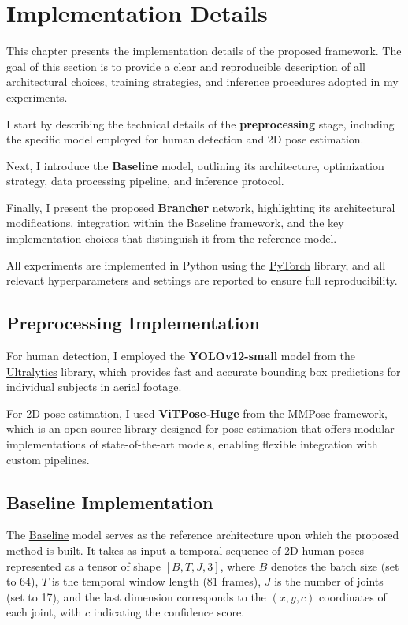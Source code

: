 \chapter{Implementation Details}
This chapter presents the implementation details of the proposed framework. The goal of this section is to provide a clear and reproducible description of all architectural choices, training strategies, and inference procedures 
adopted in my experiments.

I start by describing the technical details of the \textbf{preprocessing} stage, including the specific model employed for human detection and 2D pose estimation.

Next, I introduce the \textbf{Baseline} model, outlining its architecture, optimization strategy, data processing pipeline, and inference protocol.

Finally, I present the proposed \textbf{Brancher} network, highlighting its architectural modifications, integration within the Baseline framework, and the key implementation choices that distinguish it from the reference model.

All experiments are implemented in Python using the \href{https://pytorch.org}{PyTorch} library, and all relevant hyperparameters and settings are reported to ensure full reproducibility.

\section{Preprocessing Implementation}

For human detection, I employed the \textbf{YOLOv12-small} model from the \href{https://docs.ultralytics.com/models/yolo12/}{Ultralytics} library, which provides fast and accurate bounding box predictions for individual subjects in aerial footage.  

For 2D pose estimation, I used \textbf{ViTPose-Huge} from the \href{https://mmpose.readthedocs.io/en/latest/model_zoo_papers/algorithms.html}{MMPose} framework, which is an open-source library designed for pose estimation that offers modular 
implementations of state-of-the-art models, enabling flexible integration with custom pipelines.


\section{Baseline Implementation}
The \hyperref[sec:baseline]{Baseline} model serves as the reference architecture upon which the proposed method is built. It takes as input a temporal sequence of 2D human poses represented as a tensor of shape $[B, T, J, 3]$, where 
$B$ denotes the batch size (set to 64), $T$ is the temporal window length (81 frames), $J$ is the number of joints (set to 17), and the last dimension corresponds to the $(x, y, c)$ coordinates of each joint, with $c$ indicating the 
confidence score.

